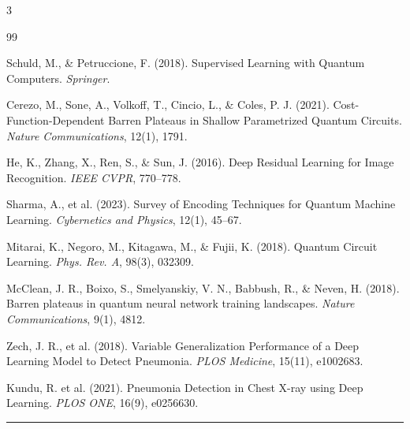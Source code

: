 \documentclass[a0,portrait]{a0poster}
\begin{document}
\begin{multicols}{3}

\renewcommand{\refname}{\textcolor{UWBBlue}{References}}

\color{TechGrey}\small

\begin{thebibliography}{99}

Schuld, M., \& Petruccione, F. (2018). Supervised Learning with Quantum Computers. \textit{Springer}.

Cerezo, M., Sone, A., Volkoff, T., Cincio, L., \& Coles, P. J. (2021). Cost-Function-Dependent Barren Plateaus in Shallow Parametrized Quantum Circuits. \textit{Nature Communications}, 12(1), 1791.

He, K., Zhang, X., Ren, S., \& Sun, J. (2016). Deep Residual Learning for Image Recognition. \textit{IEEE CVPR}, 770--778.

Sharma, A., et al. (2023). Survey of Encoding Techniques for Quantum Machine Learning. \textit{Cybernetics and Physics}, 12(1), 45--67.

Mitarai, K., Negoro, M., Kitagawa, M., \& Fujii, K. (2018). Quantum Circuit Learning. \textit{Phys. Rev. A}, 98(3), 032309.

McClean, J. R., Boixo, S., Smelyanskiy, V. N., Babbush, R., \& Neven, H. (2018). Barren plateaus in quantum neural network training landscapes. \textit{Nature Communications}, 9(1), 4812.

Zech, J. R., et al. (2018). Variable Generalization Performance of a Deep Learning Model to Detect Pneumonia. \textit{PLOS Medicine}, 15(11), e1002683.

Kundu, R. et al. (2021). Pneumonia Detection in Chest X-ray using Deep Learning. \textit{PLOS ONE}, 16(9), e0256630.

\end{thebibliography}

\end{multicols}

\vspace{0.6cm}
\noindent\textcolor{NTCPurple2}{\rule{\linewidth}{4pt}}
\vspace{0.5cm}
\end{document}
